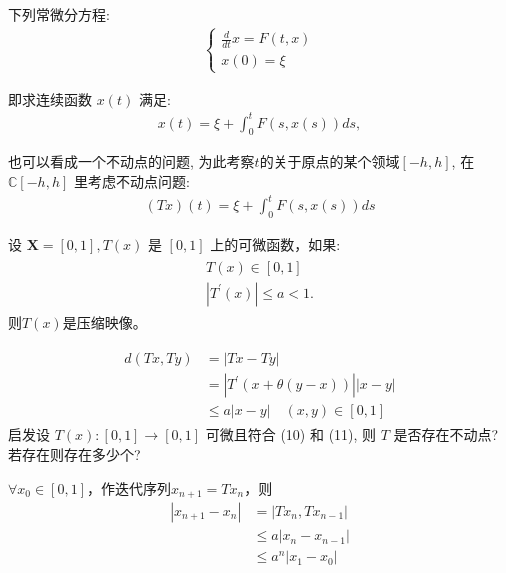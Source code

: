 下列常微分方程:
\begin{align}
    \left\{\begin{array}{l}
    \frac{d}{d t} x=F(t, x) \\
    x(0)=\xi
    \end{array}\right.
\end{align}

即求连续函数 $x(t)$ 满足:
\begin{align}
    x(t)=\xi+\int_0^t F(s, x(s)) d s,
\end{align}

也可以看成一个不动点的问题, 为此考察$t$的关于原点的某个领域$[-h, h]$, 在$\mathbb{C}[-h, h]$ 里考虑不动点问题:
\begin{align}
    (T x)(t)=\xi+\int_0^t F(s, x(s)) d s
\end{align}

\begin{example}
    设 $\mathbf{X}=[0,1], T(x)$ 是 $[0,1]$ 上的可微函数，如果:
    \begin{align*}
        \begin{gathered}
            T(x) \in[0,1] \\
            \left|T^{\prime}(x)\right| \leq a<1 .
        \end{gathered}
    \end{align*}
则$T(x)$是压缩映像。
\end{example}
\begin{solution}
    \begin{align*}
        \begin{aligned}
            d(T x, T y) & =|T x-T y| \\
            & =\left|T^{\prime}(x+\theta(y-x))\right||x-y| \\
            & \leq a|x-y| \quad(x, y) \in[0,1]
        \end{aligned}
    \end{align*}
启发设 $T(x):[0,1] \rightarrow[0,1]$ 可微且符合 (10) 和 (11), 则 $T$ 是否存在不动点? 若存在则存在多少个?
\end{solution}

$\forall x_0\in[0, 1]$，作迭代序列$x_{n+1} = Tx_n$，则
\begin{align}
    |x_{n+1} - x_n| & = |Tx_n, Tx_{n-1}| \nonumber\\
    &\leqslant a|x_n - x_{n-1}|\nonumber \\
    &\leqslant a^n|x_1-x_0|
\end{align}

